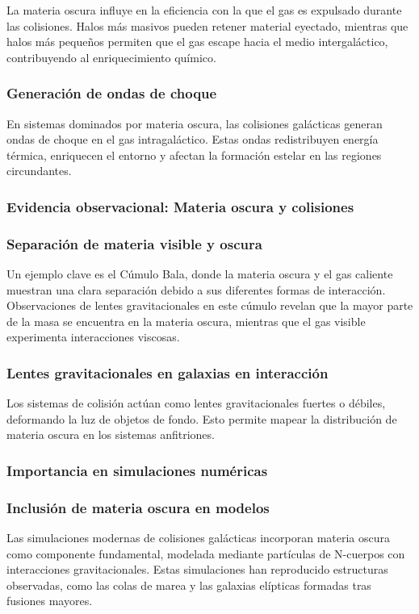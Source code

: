 \documentclass{article}
\begin{document}
La materia oscura influye en la eficiencia con la que el gas es expulsado durante las colisiones.
Halos más masivos pueden retener material eyectado, mientras que halos más pequeños permiten que el gas escape hacia el medio intergaláctico, contribuyendo al enriquecimiento químico.
\subsubsection*{Generación de ondas de choque}

En sistemas dominados por materia oscura, las colisiones galácticas generan ondas de choque en el gas intragaláctico. Estas ondas redistribuyen energía térmica, enriquecen el entorno y afectan la formación estelar en las regiones circundantes.
\subsubsection{Evidencia observacional: Materia oscura y colisiones}
\subsubsection*{Separación de materia visible y oscura}

Un ejemplo clave es el Cúmulo Bala, donde la materia oscura y el gas caliente muestran una clara separación debido a sus diferentes formas de interacción.
Observaciones de lentes gravitacionales en este cúmulo revelan que la mayor parte de la masa se encuentra en la materia oscura, mientras que el gas visible experimenta interacciones viscosas.
\subsubsection*{Lentes gravitacionales en galaxias en interacción}

Los sistemas de colisión actúan como lentes gravitacionales fuertes o débiles, deformando la luz de objetos de fondo. Esto permite mapear la distribución de materia oscura en los sistemas anfitriones.
\subsubsection{Importancia en simulaciones numéricas}
\subsubsection*{Inclusión de materia oscura en modelos}

Las simulaciones modernas de colisiones galácticas incorporan materia oscura como componente fundamental, modelada mediante partículas de N-cuerpos con interacciones gravitacionales. Estas simulaciones han reproducido estructuras observadas, como las colas de marea y las galaxias elípticas formadas tras fusiones mayores.
\end{document}
